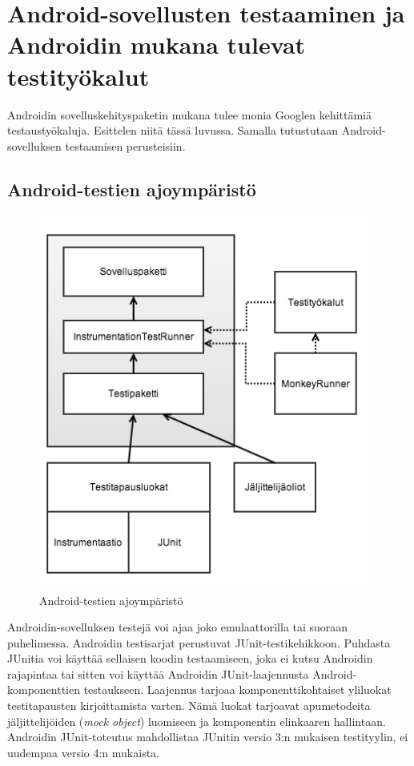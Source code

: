 \section{Android-sovellusten testaaminen ja Androidin mukana tulevat testityökalut}

Androidin sovelluskehityspaketin mukana tulee monia Googlen kehittämiä testaustyökaluja. Esittelen niitä tässä luvussa. Samalla tutustutaan Android-sovelluksen testaamisen perusteisiin.

\subsection{Android-testien ajoympäristö}

\begin{figure}[htb]
\includegraphics[width=110mm]{test_framework.png}
\caption{Android-testien ajoympäristö \protect\cite{android}} \label{test_framework}
\end{figure}

Androidin-sovelluksen testejä voi ajaa joko emulaattorilla tai suoraan puhelimessa. Androidin testisarjat perustuvat JUnit-testikehikkoon. Puhdasta JUnitia voi käyttää sellaisen koodin testaamiseen, joka ei kutsu Androidin rajapintaa tai sitten voi käyttää Androidin JUnit-laajennusta Android-komponenttien testaukseen. Laajennus tarjoaa komponenttikohtaiset yliluokat testitapausten kirjoittamista varten. Nämä luokat tarjoavat apumetodeita jäljittelijöiden (\emph{mock object}) luomiseen ja komponentin elinkaaren hallintaan. Androidin JUnit-toteutus mahdollistaa JUnitin versio 3:n mukaisen testityylin, ei uudempaa versio 4:n mukaista.


